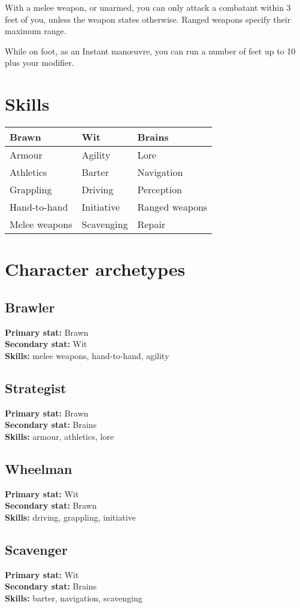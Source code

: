 \documentclass[10pt, a4paper, twocolumn]{article}
\begin{document}
With a melee weapon, or unarmed, you can only attack a combatant within 3 feet
of you, unless the weapon states otherwise. Ranged weapons specify their maximum
range. 

While on foot, as an Instant man\oe{}uvre, you can run a number of feet up to 10
plus your  modifier.

\clearpage
\subtitle{Lists and Tables}
\compacttitle

\section{Skills}
\begin{tabular}{lll}
  Brawn         & Wit        & Brains         \\
  \hline
  Armour        & Agility    & Lore           \\
  Athletics     & Barter     & Navigation     \\
  Grappling     & Driving    & Perception     \\
  Hand-to-hand  & Initiative & Ranged weapons \\
  Melee weapons & Scavenging & Repair
\end{tabular}

\section{Character archetypes}
\subsection{Brawler}
\textbf{Primary stat:} Brawn\\
\textbf{Secondary stat:} Wit\\
\textbf{Skills:} melee weapons, hand-to-hand, agility
\subsection{Strategist}
\textbf{Primary stat:} Brawn\\
\textbf{Secondary stat:} Brains\\
\textbf{Skills:} armour, athletics, lore
\subsection{Wheelman}
\textbf{Primary stat:} Wit\\
\textbf{Secondary stat:} Brawn\\
\textbf{Skills:} driving, grappling, initiative
\subsection{Scavenger}
\textbf{Primary stat:} Wit\\
\textbf{Secondary stat:} Brains\\
\textbf{Skills:} barter, navigation, scavenging
\end{document}
